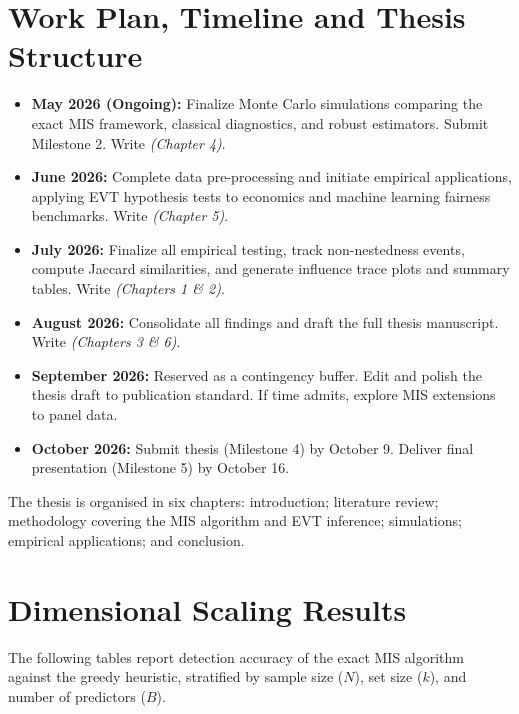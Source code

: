 \documentclass[12pt]{article}
\begin{document}
\section{Work Plan, Timeline and Thesis Structure}

\begin{itemize}
	\setlength{\itemsep}{1.5pt}
	\setlength{\parskip}{1.5pt}
	\setlength{\parsep}{1.5pt}
	\item \textbf{May 2026 (Ongoing):} Finalize Monte Carlo simulations comparing the exact MIS framework, classical diagnostics, and robust estimators. Submit 
	Milestone 2. Write \textit{(Chapter 4)}.
	
	\item \textbf{June 2026:} Complete data pre-processing and initiate empirical applications, applying EVT hypothesis tests to economics and machine learning fairness benchmarks. Write \textit{(Chapter 5)}.
	
	\item \textbf{July 2026:} Finalize all empirical testing, track non-nestedness events, compute Jaccard similarities, and generate influence trace plots and 
	summary tables. Write \textit{(Chapters 1 \& 2)}.
	
	\item \textbf{August 2026:} Consolidate all findings and draft the full thesis manuscript. Write \textit{(Chapters 3 \& 6)}.
	
	\item \textbf{September 2026:} Reserved as a contingency buffer. Edit and polish the thesis draft to publication standard. If time admits, explore MIS extensions to panel data.
	
	\item \textbf{October 2026:} Submit thesis (Milestone 4) by October 9. Deliver final presentation (Milestone 5) by October 16.
	
\end{itemize}

\noindent The thesis is organised in six chapters: introduction; literature review; methodology covering the MIS algorithm and EVT inference; simulations; empirical applications; and conclusion.



\newpage
\appendix
\section{Dimensional Scaling Results}
\label{app:scaling}
The following tables report detection accuracy of the exact MIS algorithm against the greedy heuristic, stratified by sample size ($N$), set size ($k$), and number of predictors ($B$).



\clearpage 
\newpage
\printbibliography
\end{document}
